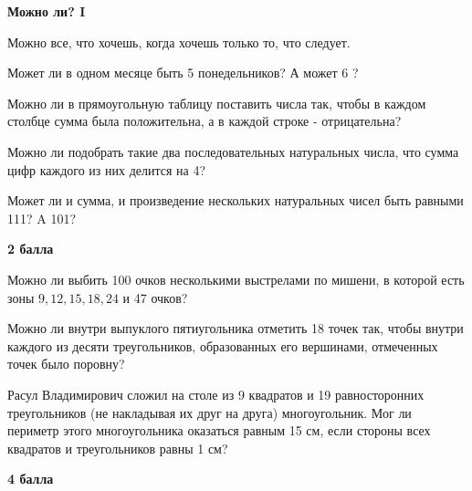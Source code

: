 \centerline{\bf \Huge Можно ли? I}

\begin{flushright}
        \scriptsize{Можно все, что хочешь, когда хочешь только то, что следует.}
\end{flushright}

 Может ли в одном месяце быть 5 понедельников? А может 6 ?

 Можно ли в прямоугольную таблицу поставить числа так, чтобы в каждом столбце сумма была положительна, а в каждой строке - отрицательна?

 Можно ли подобрать такие два последовательных натуральных числа, что сумма цифр каждого из них делится на 4?

 Может ли и сумма, и произведение нескольких натуральных чисел быть равными 111? A 101?

\begin{flushright} \textbf{2 балла}\\ 
\end{flushright}

 Можно ли выбить 100 очков несколькими выстрелами по мишени, в которой есть зоны $9,12,15,18,24$ и 47 очков?

 Можно ли внутри выпуклого пятиугольника отметить 18 точек так, чтобы внутри каждого из десяти треугольников, образованных его вершинами, отмеченных точек было поровну?

 Расул Владимирович сложил на столе из 9 квадратов и 19 равносторонних треугольников (не накладывая их друг на друга) многоугольник. Мог ли периметр
этого многоугольника оказаться равным 15 см, если стороны всех квадратов и треугольников
равны 1 см?


\begin{flushright} \textbf{4 балла}\\ 
\end{flushright}
